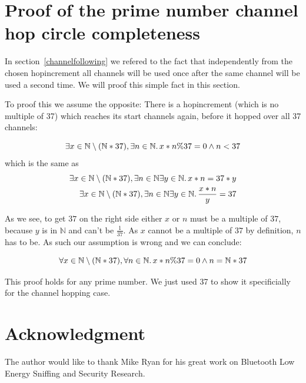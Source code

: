 \documentclass[conference]{IEEEtran}
\begin{document}
\appendices
\section{Proof of the prime number channel hop circle completeness}

In section~\ref{channelfollowing} we refered to the fact that independently from the chosen hopincrement all channels will be used once after the same channel will be used a second time. We will proof this simple fact in this section.

To proof this we assume the opposite: There is a hopincrement (which is no multiple of 37) which reaches its start channels again, before it hopped over all 37 channels:

\begin{equation*}
  \exists x\in\mathbb{N}\setminus (\mathbb{N} * 37), \exists n\in\mathbb{N}\ldotp x*n \% 37 = 0 \wedge n < 37
\end{equation*}
which is the same as
\begin{equation*}
  \begin{split}
    \exists x\in\mathbb{N}\setminus (\mathbb{N} * 37), \exists n\in\mathbb{N}\exists y\in\mathbb{N}\ldotp x*n = 37 * y \\
    \exists x\in\mathbb{N}\setminus (\mathbb{N} * 37), \exists n\in\mathbb{N}\exists y\in\mathbb{N}\ldotp \frac{x*n}{y} = 37
  \end{split}
\end{equation*}

As we see, to get $37$ on the right side either $x$ or $n$ must be a multiple of $37$, because $y$ is in $\mathbb{N}$ and can't be $\frac{1}{37}$. As $x$ cannot be a multiple of $37$ by definition, $n$ has to be. As such our assumption is wrong and we can conclude:

\begin{equation*}
  \forall x\in\mathbb{N}\setminus (\mathbb{N} * 37), \forall n\in\mathbb{N}\ldotp x*n \% 37 = 0 \wedge n = \mathbb{N} * 37
\end{equation*}

This proof holds for any prime number. We just used 37 to show it specificially for the channel hopping case.

\section*{Acknowledgment}

The author would like to thank Mike Ryan for his great work on Bluetooth Low Energy Sniffing and Security Research.
\end{document}
